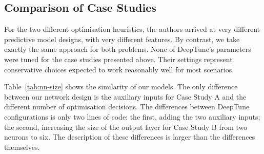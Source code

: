 \subsection{Comparison of Case Studies}



For the two different optimisation heuristics, the authors arrived at very different predictive model designs, with very different features. By contrast, we take exactly the same approach for both problems. None of DeepTune's parameters were tuned for the case studies presented above. Their settings represent conservative choices expected to work reasonably well for most scenarios.

Table~\ref{tab:nn-size} shows the similarity of our models. The only difference between our network design is the auxiliary inputs for Case Study A and the different number of optimisation decisions. The differences between DeepTune configurations is only two lines of code: the first, adding the two auxiliary inputs; the second, increasing the size of the output layer for Case Study B from two neurons to six. The description of these differences is larger than the differences themselves.
